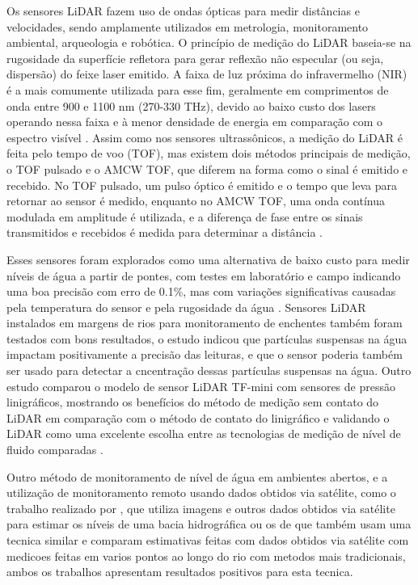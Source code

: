 Os sensores LiDAR fazem uso de ondas ópticas para medir distâncias e velocidades, sendo amplamente utilizados em metrologia, monitoramento ambiental, arqueologia e robótica\cite{behroozpour_2017_lidar, li_2022_a}. O princípio de medição do LiDAR baseia-se na rugosidade da superfície refletora para gerar reflexão não especular (ou seja, dispersão) do feixe laser emitido. A faixa de luz próxima do infravermelho (NIR) é a mais comumente utilizada para esse fim, geralmente em comprimentos de onda entre 900 e 1100 nm (270-330 THz), devido ao baixo custo dos lasers operando nessa faixa e à menor densidade de energia em comparação com o espectro visível \cite{li_2022_a, fernandezdiaz_2014_early, smart_2009_river, behroozpour_2017_lidar}. Assim como nos sensores ultrassônicos, a medição do LiDAR é feita pelo tempo de voo (TOF), mas existem dois métodos principais de medição, o TOF pulsado e o AMCW TOF, que diferem na forma como o sinal é emitido e recebido. No TOF pulsado, um pulso óptico é emitido e o tempo que leva para retornar ao sensor é medido, enquanto no AMCW TOF, uma onda contínua modulada em amplitude é utilizada, e a diferença de fase entre os sinais transmitidos e recebidos é medida para determinar a distância \cite{li_2022_a}.

Esses sensores foram explorados como uma alternativa de baixo custo para medir níveis de água a partir de pontes, com testes em laboratório e campo indicando uma boa precisão com erro de 0.1\%, mas com variações significativas causadas pela temperatura do sensor e pela rugosidade da água \cite{paul_2020_a}. Sensores LiDAR instalados em margens de rios para monitoramento de enchentes também foram testados com bons resultados, o estudo indicou que partículas suspensas na água impactam positivamente a precisão das leituras, e que o sensor poderia também ser usado para detectar a cncentração dessas partículas suspensas na água\cite{tamari_2016_flash}. Outro estudo comparou o modelo de sensor LiDAR TF-mini com sensores de pressão linigráficos, mostrando os benefícios do método de medição sem contato do LiDAR em comparação com o método de contato do linigráfico e validando o LiDAR como uma excelente escolha entre as tecnologias de medição de nível de fluido comparadas \cite{santana_2024_development}.

Outro método de monitoramento de nível de água em ambientes abertos, e a utilização de monitoramento remoto usando dados obtidos via satélite, como o trabalho realizado por \textcite{jiang_2024_monitoring}, que utiliza imagens e outros dados obtidos via satélite para estimar os níveis de uma bacia hidrográfica ou os de \textcite{ali_2024_satellite} que também usam uma tecnica similar e comparam  estimativas feitas com dados obtidos via satélite com medicoes feitas em varios pontos ao longo do rio com metodos mais tradicionais, ambos os trabalhos apresentam resultados positivos para esta tecnica.

